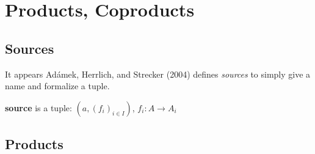 \section{Products, Coproducts}

\subsection{Sources}

It appears Ad\'{a}mek, Herrlich, and Strecker (2004) \cite{agat:AHS2004} defines \emph{sources} to simply give a name and formalize a tuple.  

\begin{definition}[source]
	\textbf{source} is a tuple: $(a, (f_i)_{i\in I})$, $f_i:A\to A_i$
\end{definition}

\subsection{Products}

